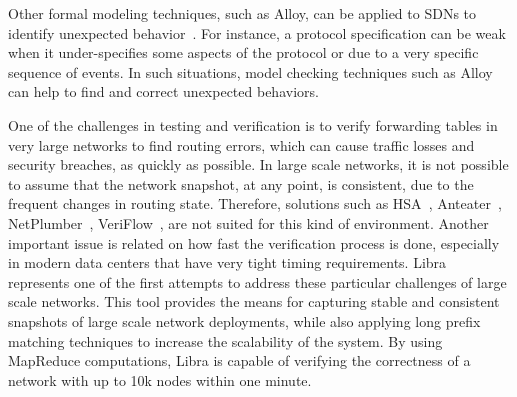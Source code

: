 Other formal modeling techniques, such as Alloy, can be applied to SDNs to identify unexpected 
behavior~\cite{ruchansky2013}. For instance, a protocol specification can be weak 
when it under-specifies some aspects of the protocol or due to a very specific sequence of events.
In such situations, model checking techniques such as Alloy can help to find and correct unexpected 
behaviors.


One of the challenges in testing and verification is to verify forwarding tables in very large networks to find routing errors, which can cause traffic losses and security breaches, as quickly as possible.
In large scale networks, it is not possible to assume that the network snapshot, at any point, is consistent, 
due to the frequent changes in routing state.
Therefore, solutions such as HSA~\cite{kazemian2012}, Anteater~\cite{mai2011}, NetPlumber~\cite{kazemian2013}, VeriFlow~\cite{khurshid2012},  are not suited for this kind of environment.
Another important issue is related on how fast the verification process is done, especially in modern data centers
that have very tight timing requirements. Libra~\cite{zeng2014} represents one of the first attempts to address 
these particular challenges of large scale networks. 
This tool provides the means for capturing stable and consistent 
snapshots of large scale network deployments, while also applying long prefix matching techniques 
to increase the scalability of the system.
By using MapReduce computations, Libra is capable of verifying the correctness of a 
network with up to 10k nodes within one minute.

